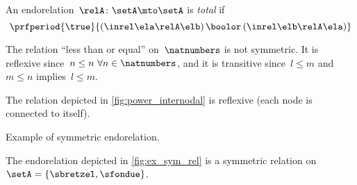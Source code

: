 \begin{ctdefinition}
    \label{def:endo_total}
    An endorelation~$\relA\colon \setA\mto \setA$ is \emph{total} if
    \begin{equation}
        \prfperiod{
            \true
        }{
            (\inrel\ela\relA\elb )\,\boolor\, (\inrel\elb\relA\ela)
        }
    \end{equation}

\end{ctdefinition}

\begin{example}
    The relation ``less than or equal'' on~$\natnumbers$ is not symmetric.
    It is reflexive since~$n\leq n \ \forall n\in \natnumbers$, and it is transitive since~$l\leq m$ and~$m\leq n$ implies~$l\leq m$.
\end{example}

\begin{example}
    The relation depicted in \vref{fig:power_internodal} is reflexive (each node is connected to itself).
\end{example}
\begin{marginfigure}
    \centering
    \caption{Example of symmetric endorelation.}
    \label{fig:ex_sym_rel}
\end{marginfigure}
\begin{example}
    The endorelation depicted in \vref{fig:ex_sym_rel} is a symmetric relation on~$\setA=\{\sbretzel,\sfondue\}$.
\end{example}




